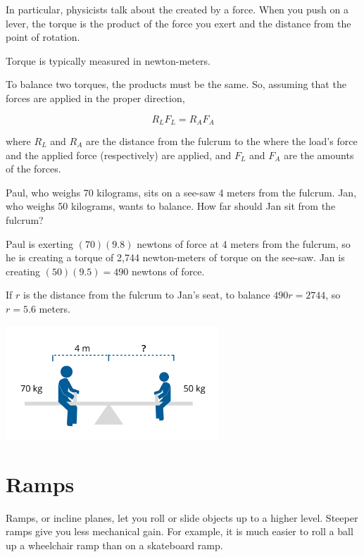 In particular, physicists talk about the  created by a
force. When you push on a lever, the torque is the product of the
force you exert and the distance from the point of rotation.

Torque is typically measured in newton-meters.

To balance two torques, the products must be the same. So, assuming
that the forces are applied in the proper direction,

$$R_L F_L = R_A F_A$$

where $R_L$ and $R_A$ are the distance from the fulcrum to the where
the load's force and the applied force (respectively) are applied, and
$F_L$ and $F_A$ are the amounts of the forces.

\begin{Exercise}[title={Lever}, label=lever]

Paul, who weighs 70 kilograms, sits on a see-saw 4 meters from the
fulcrum. Jan, who weighs 50 kilograms, wants to balance. How far
should Jan sit from the fulcrum?

\end{Exercise}
\begin{Answer}[ref=lever]
  Paul is exerting $(70)(9.8)$ newtons of force at 4 meters from the
  fulcrum, so he is creating a torque of 2,744 newton-meters of torque
  on the see-saw.  Jan is creating $(50)(9.5) = 490$ newtons of
  force.

  If $r$ is the distance from the fulcrum to Jan's seat, to balance
  $490 r = 2744$, so $r = 5.6$ meters.
\end{Answer}


\includegraphics[width=0.6\textwidth]{seesaw.png}

\section{Ramps}

Ramps, or incline planes, let you roll or slide objects up to a higher
level. Steeper ramps give you less mechanical gain. For example, it is much easier
to roll a ball up a wheelchair ramp than on a skateboard ramp.

